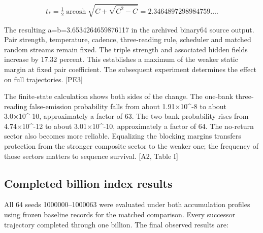 \[t_* =\tfrac12\operatorname{arcosh}\sqrt{C+\sqrt{C^2-C}}=2.3464897298984759\ldots.\]

The resulting a=b=3.6534264659876117 in the archived binary64 source output. Pair strength, temperature, cadence, three-reading rule, scheduler and matched random streams remain fixed. The triple strength and associated hidden fields increase by 17.32 percent. This establishes a maximum of the weaker static margin at fixed pair coefficient. The subsequent experiment determines the effect on full trajectories. {[}PE3{]}

The finite-state calculation shows both sides of the change. The one-bank three-reading false-emission probability falls from about 1.91×10\^{}-8 to about 3.0×10\^{}-10, approximately a factor of 63. The two-bank probability rises from 4.74×10\^{}-12 to about 3.01×10\^{}-10, approximately a factor of 64. The no-return sector also becomes more reliable. Equalizing the blocking margins transfers protection from the stronger composite sector to the weaker one; the frequency of those sectors matters to sequence survival. {[}A2, Table I{]}

\subsection{Completed billion index results}\label{completed-billion-index-results}

All 64 seeds 1000000--1000063 were evaluated under both accumulation profiles using frozen baseline records for the matched comparison. Every successor trajectory completed through one billion. The final observed results are:

